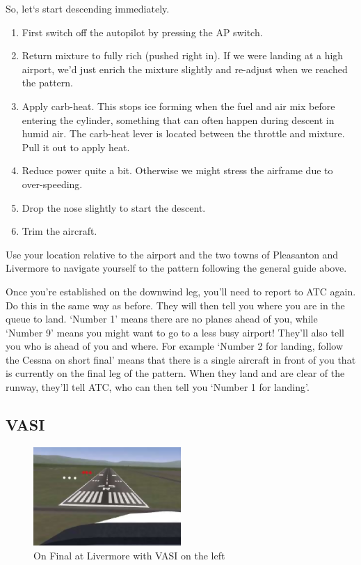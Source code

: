 So, let`s start descending immediately.

\begin{enumerate}
\item First switch off the autopilot by pressing the AP switch.

\item Return mixture to fully rich (pushed right in). If we were landing at a
high airport, we'd just enrich the mixture slightly and re-adjust when we reached the pattern.

\item Apply carb-heat. This stops ice forming when the fuel and air mix before
entering the cylinder, something that can often happen during descent in humid air.
The carb-heat lever is located between the throttle and mixture. Pull it out to apply heat.

\item Reduce power quite a bit. Otherwise we might stress the airframe due to over-speeding.

\item Drop the nose slightly to start the descent.

\item Trim the aircraft.

\end{enumerate}

Use your location relative to the airport and the two towns of Pleasanton and
Livermore to navigate yourself to the pattern following the general guide above.

Once you're established on the downwind leg, you'll need to report to ATC again.
Do this in the same way as before. They will then tell you where you are in the
queue to land. `Number 1' means there are no planes ahead of you, while
`Number 9' means you might want to go to a less busy airport! They'll also
tell you who is ahead of you and where. For example `Number 2 for landing,
follow the Cessna on short final' means that there is a single aircraft in
front of you that is currently on the final leg of the pattern. When they land and are
clear of the runway, they'll tell ATC, who can then tell you `Number 1 for landing'.

\subsection{VASI}

\begin{figure}[!htp]
\centering
\includegraphics[width=0.5\textwidth]{vasi2}
\caption{On Final at Livermore with VASI on the left\label{vasi}}
\end{figure}


